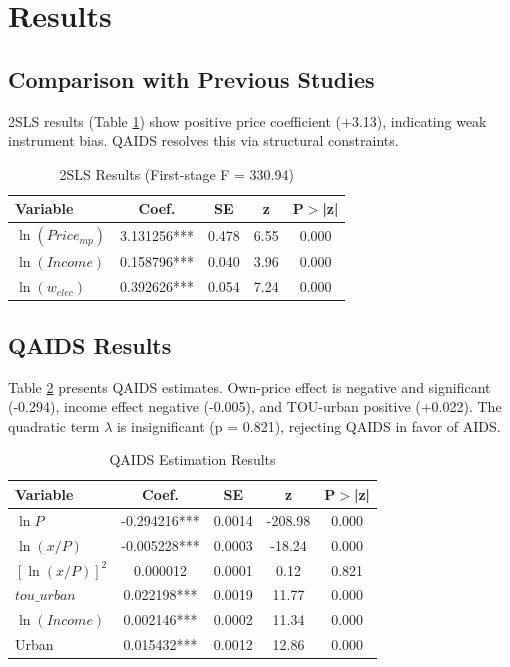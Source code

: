 \documentclass[12pt,a4paper]{article}
\begin{document}
	\section{Results}
	
	\subsection{Comparison with Previous Studies}
	2SLS results (Table \ref{tab:2sls}) show positive price coefficient (+3.13), indicating weak instrument bias. QAIDS resolves this via structural constraints.
	
	\begin{table}[htbp]
		\caption{2SLS Results (First-stage F = 330.94)}
		\label{tab:2sls}
		\centering
		\begin{tabular}{lcccc}
			\toprule
			Variable & Coef. & SE & z & P$>$|z| \\
			\midrule
			$\ln(Price_{mp})$ & 3.131256*** & 0.478 & 6.55 & 0.000 \\
			$\ln(Income)$ & 0.158796*** & 0.040 & 3.96 & 0.000 \\
			$\ln(w_{elec})$ & 0.392626*** & 0.054 & 7.24 & 0.000 \\
			\bottomrule
		\end{tabular}
	\end{table}
	
	\subsection{QAIDS Results}
	Table \ref{tab:qaids} presents QAIDS estimates. Own-price effect is negative and significant (-0.294), income effect negative (-0.005), and TOU-urban positive (+0.022). The quadratic term $\lambda$ is insignificant (p = 0.821), rejecting QAIDS in favor of AIDS.
	
	\begin{table}[htbp]
		\caption{QAIDS Estimation Results}
		\label{tab:qaids}
		\centering
		\begin{tabular}{lcccc}
			\toprule
			Variable & Coef. & SE & z & P$>$|z| \\
			\midrule
			$\ln P$ & -0.294216*** & 0.0014 & -208.98 & 0.000 \\
			$\ln(x/P)$ & -0.005228*** & 0.0003 & -18.24 & 0.000 \\
			$[\ln(x/P)]^2$ & 0.000012 & 0.0001 & 0.12 & 0.821 \\
			$tou\_urban$ & 0.022198*** & 0.0019 & 11.77 & 0.000 \\
			$\ln(Income)$ & 0.002146*** & 0.0002 & 11.34 & 0.000 \\
			Urban & 0.015432*** & 0.0012 & 12.86 & 0.000 \\
			\bottomrule
		\end{tabular}
	\end{table}
	
\end{document}
